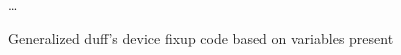 \begin{figure}[H]
    \begin{algorithmic}
                \State {}
            \EndCase
                \State {}
            \EndCase
            \State \ldots
                \State {}
            \EndCase
        \EndSwitch
    \end{algorithmic}
    \caption{Generalized duff's device fixup code based on variables present}
    \label{fig:impl:fixup:duff:fixup-bound}
\end{figure}